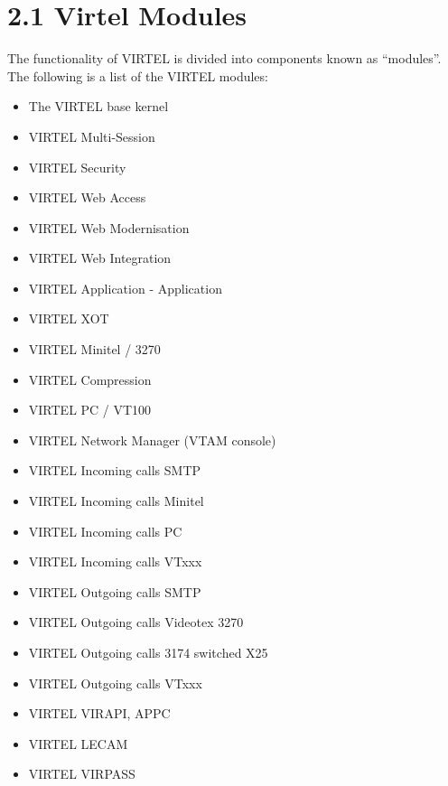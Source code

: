 \documentclass[letterpaper,10pt,english]{sphinxmanual}
\begin{document}
\section{2.1 Virtel Modules}
\label{\detokenize{Installation_Guide:virtel-modules}}
The functionality of VIRTEL is divided into components known as “modules”. The following is a list of the VIRTEL modules:
\begin{itemize}
\item {} 
The VIRTEL base kernel

\item {} 
VIRTEL Multi-Session

\item {} 
VIRTEL Security

\item {} 
VIRTEL Web Access

\item {} 
VIRTEL Web Modernisation

\item {} 
VIRTEL Web Integration

\item {} 
VIRTEL Application - Application

\item {} 
VIRTEL XOT

\item {} 
VIRTEL Minitel / 3270

\item {} 
VIRTEL Compression

\item {} 
VIRTEL PC / VT100

\item {} 
VIRTEL Network Manager (VTAM console)

\item {} 
VIRTEL Incoming calls SMTP

\item {} 
VIRTEL Incoming calls Minitel

\item {} 
VIRTEL Incoming calls PC

\item {} 
VIRTEL Incoming calls VTxxx

\item {} 
VIRTEL Outgoing calls SMTP

\item {} 
VIRTEL Outgoing calls Videotex 3270

\item {} 
VIRTEL Outgoing calls 3174 switched X25

\item {} 
VIRTEL Outgoing calls VTxxx

\item {} 
VIRTEL VIRAPI, APPC

\item {} 
VIRTEL LECAM

\item {} 
VIRTEL VIRPASS

\end{itemize}
\end{document}

